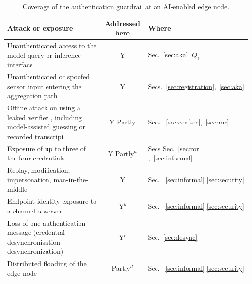 \documentclass[cmc,article,submit,moreauthors,pdftex]{Definitions/tsp}
\providecommand{\DIFadd}[1]{{\protect\color{blue} \sf #1}} %
\providecommand{\DIFdel}[1]{{\protect\color{red} \scriptsize #1}} %
\providecommand{\DIFdelbegin}{} %
\providecommand{\DIFdelend}{} %
\providecommand{\DIFaddFL}[1]{\DIFadd{#1}} %
\providecommand{\DIFdelFL}[1]{\DIFdel{#1}} %
\providecommand{\DIFaddbeginFL}{} %
\providecommand{\DIFaddendFL}{} %
\providecommand{\DIFdelbeginFL}{} %
\providecommand{\DIFdelendFL}{} %
\begin{document}
\DIFdelbegin %

\DIFdelend \begin{table}[t]
\caption{Coverage of the authentication guardrail at an AI-enabled edge node.\label{tab:coverage}}
\begin{tabularx}{\textwidth}{Xcl}
\toprule
\textbf{Attack or exposure} & \textbf{Addressed here} & \textbf{Where}\\
\midrule
Unauthenticated access to the model-query or inference interface & Y & Sec.~\ref{sec:aka}, $Q_1$\\
Unauthenticated or spoofed sensor input entering the aggregation path & Y & Secs.~\ref{sec:registration},~\ref{sec:aka}\\
Offline attack \DIFdelbeginFL \DIFdelFL{on }\DIFdelendFL \DIFaddbeginFL \DIFaddFL{using }\DIFaddendFL a leaked verifier \DIFdelbeginFL \DIFdelFL{, including model-assisted guessing }\DIFdelendFL \DIFaddbeginFL \DIFaddFL{or recorded transcript }\DIFaddendFL & \DIFdelbeginFL \DIFdelFL{Y }\DIFdelendFL \DIFaddbeginFL \DIFaddFL{Partly }\DIFaddendFL & Secs.~\ref{sec:ceafsec},~\ref{sec:ror}\\
Exposure of up to three of the four credentials & \DIFdelbeginFL \DIFdelFL{Y}\DIFdelendFL \DIFaddbeginFL \DIFaddFL{Partly}\DIFaddendFL $^{a}$ & \DIFdelbeginFL \DIFdelFL{Secs}\DIFdelendFL \DIFaddbeginFL \DIFaddFL{Sec}\DIFaddendFL .~\ref{sec:ror}\DIFdelbeginFL \DIFdelFL{,~\ref{sec:informal}}\DIFdelendFL \\
Replay, modification, impersonation, man-in-the-middle & Y & Sec.~\DIFdelbeginFL \DIFdelFL{\ref{sec:informal}}\DIFdelendFL \DIFaddbeginFL \DIFaddFL{\ref{sec:security}}\DIFaddendFL \\
Endpoint identity exposure to a channel observer & Y$^{b}$ & Sec.~\DIFdelbeginFL \DIFdelFL{\ref{sec:informal}}\DIFdelendFL \DIFaddbeginFL \DIFaddFL{\ref{sec:security}}\DIFaddendFL \\
Loss of one authentication message (credential \DIFdelbeginFL \DIFdelFL{desynchronisation}\DIFdelendFL \DIFaddbeginFL \DIFaddFL{desynchronization}\DIFaddendFL ) & Y$^{c}$ & Sec.~\ref{sec:desync}\\
Distributed flooding of the edge node & Partly$^{d}$ & Sec.~\DIFdelbeginFL \DIFdelFL{\ref{sec:informal}}\DIFdelendFL \DIFaddbeginFL \DIFaddFL{\ref{sec:security}}\DIFaddendFL \\

\end{tabularx}
\end{table}
\end{document}
